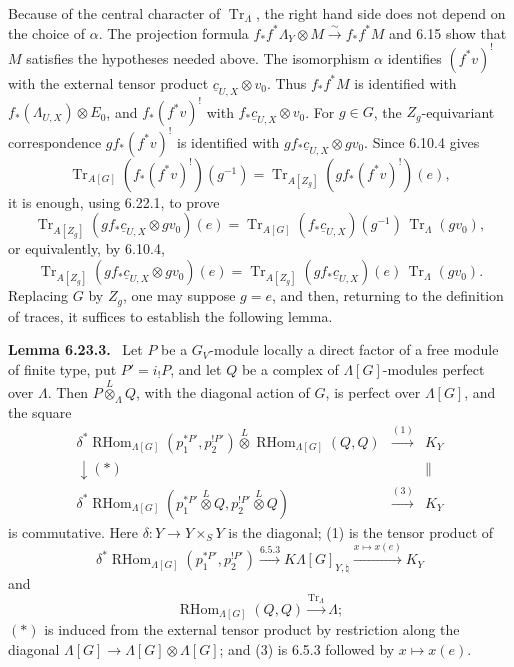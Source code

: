 \documentclass[11pt]{article}
\theoremstyle{plain}
\theoremstyle{definition}
\theoremstyle{remark}
\newenvironment{statement}[1]{\par\medskip\noindent\textbf{#1.}\ }{\par\medskip}
\DeclareMathOperator{\Tr}{Tr}
\DeclareMathOperator{\RHom}{RHom}
\begin{document}
Because of the central character of $\Tr_\Lambda$, the right hand side does not
depend on the choice of $\alpha$. The projection formula
$f_*f^*\Lambda_Y\otimes M\xrightarrow{\sim}f_*f^*M$ and 6.15 show that $M$
satisfies the hypotheses needed above. The isomorphism $\alpha$ identifies
$(f^*v)^!$ with the external tensor product $\underline c_{U,X}\otimes v_0$.
Thus $f_*f^*M$ is identified with $f_*(\Lambda_{U,X})\otimes E_0$, and
$f_*(f^*v)^!$ with $f_*\underline c_{U,X}\otimes v_0$. For $g\in G$, the
$Z_g$-equivariant correspondence $g f_*(f^*v)^!$ is identified with
$g f_*\underline c_{U,X}\otimes g v_0$. Since 6.10.4 gives
\[
\Tr_{A[G]}(f_*(f^*v)^!)(g^{-1})=
\Tr_{A[Z_g]}(g f_*(f^*v)^!)(e),
\]
it is enough, using 6.22.1, to prove
\[
\Tr_{A[Z_g]}(g f_*\underline c_{U,X}\otimes gv_0)(e)=
\Tr_{A[G]}(f_*\underline c_{U,X})(g^{-1})\,\Tr_\Lambda(gv_0),
\]
or equivalently, by 6.10.4,
\begin{equation}\tag{6.23.2}
\Tr_{A[Z_g]}(g f_*\underline c_{U,X}\otimes gv_0)(e)=
\Tr_{A[Z_g]}(g f_*\underline c_{U,X})(e)\,\Tr_\Lambda(gv_0).
\end{equation}
Replacing $G$ by $Z_g$, one may suppose $g=e$, and then, returning to the definition
of traces, it suffices to establish the following lemma.

\begin{statement}{Lemma 6.23.3}
Let $P$ be a $G_V$-module locally a direct factor of a free module of finite type, put
$P'=i_!P$, and let $Q$ be a complex of $\Lambda[G]$-modules perfect over
$\Lambda$. Then $P\overset{L}{\otimes}_\Lambda Q$, with the diagonal action of $G$,
is perfect over $\Lambda[G]$, and the square
\[
\begin{array}{ccc}
\delta^*\RHom_{\Lambda[G]}(p_1^{*P'},p_2^{!P'})
\overset{L}{\otimes}\RHom_{\Lambda[G]}(Q,Q)&\xrightarrow{(1)}&K_Y\\[8pt]
\downarrow\scriptstyle(*) && \parallel\\[8pt]
\delta^*\RHom_{\Lambda[G]}(p_1^{*P'}\overset{L}{\otimes}Q,
 p_2^{!P'}\overset{L}{\otimes}Q)&\xrightarrow{(3)}&K_Y
\end{array}
\]
is commutative. Here $\delta:Y\to Y\times_S Y$ is the diagonal; (1) is the tensor
product of
\[
\delta^*\RHom_{\Lambda[G]}(p_1^{*P'},p_2^{!P'})\xrightarrow{6.5.3}
K\Lambda[G]_{Y,\natural}\xrightarrow{x\mapsto x(e)}K_Y
\]
and
\[
\RHom_{\Lambda[G]}(Q,Q)\xrightarrow{\Tr_\Lambda}\Lambda;
\]
$(*)$ is induced from the external tensor product by restriction along the diagonal
$\Lambda[G]\to\Lambda[G]\otimes\Lambda[G]$; and (3) is 6.5.3 followed by
$x\mapsto x(e)$.
\end{statement}
\end{document}
